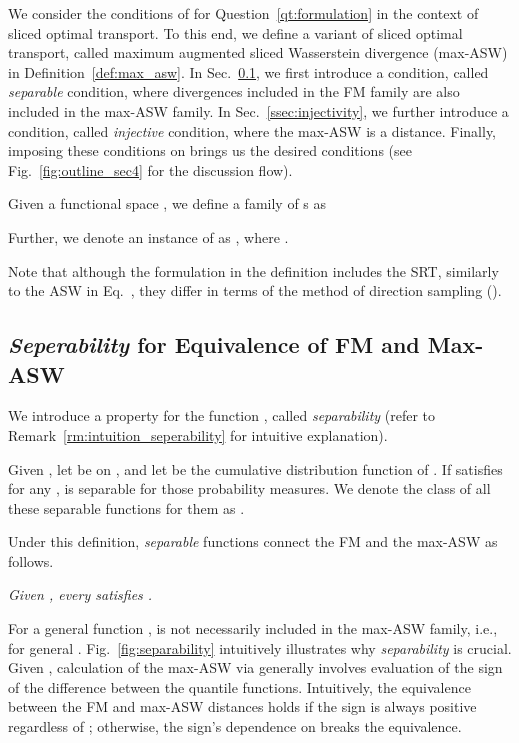 We consider the conditions of  for Question~\ref{qt:formulation} in the context of sliced optimal transport. To this end, we define a variant of sliced optimal transport, called maximum augmented sliced Wasserstein divergence (max-ASW) in Definition~\ref{def:max_asw}.
In Sec.~\ref{ssec:separability}, we first introduce a condition, called \textit{separable} condition, where divergences included in the FM family are also included in the max-ASW family.
In Sec.~\ref{ssec:injectivity}, we further introduce a condition, called \textit{injective} condition, where the max-ASW is a distance.
Finally, imposing these conditions on  brings us the desired conditions (see Fig.~\ref{fig:outline_sec4} for the discussion flow).
\begin{definition}
    Given a functional space , we define a family of s as
    
    Further, we denote an instance of  as , where .
    \label{def:max_asw}
\end{definition}
Note that although the formulation in the definition includes the SRT, similarly to the ASW in Eq.~, they differ in terms of the method of direction sampling (). 

\subsection{\textit{Seperability} for Equivalence of FM and Max-ASW}
\label{ssec:separability}

We introduce a property for the function , called \textit{separability} (refer to Remark~\ref{rm:intuition_seperability} for intuitive explanation).
\begin{definition}[Separable]
Given , let  be on , and let  be the cumulative distribution function of .
If  satisfies  for any ,  is separable for those probability measures.
We denote the class of all these separable functions for them as .
\label{def:separable_fswd}
\end{definition}
Under this definition, \textit{separable} functions connect the FM and the max-ASW as follows.
\begin{lemma}
\textit{
Given , every  satisfies .
} \label{lm:fm_included_in_max_asw}
\end{lemma}
\begin{remark}
For a general function ,  is not necessarily included in the max-ASW family, i.e.,  for general . Fig.~\ref{fig:separability} intuitively illustrates why \textit{separability} is crucial.
Given , calculation of the max-ASW via  generally involves evaluation of the sign of the difference between the quantile functions. Intuitively, the equivalence between the FM and max-ASW distances holds if the sign is always positive regardless of ; otherwise, the sign's dependence on  breaks the equivalence. 
\label{rm:intuition_seperability}
\end{remark}



